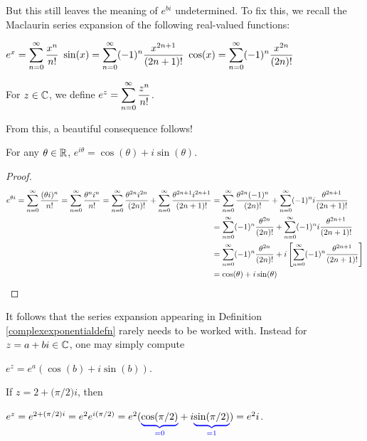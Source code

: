 \documentclass[11pt,fleqn,dvipsnames,usenames]{article}
\newcommand{\p}{\noindent}
\begin{document}
\p But this still leaves the meaning of $e^{bi}$ undetermined.  To fix this, we recall the Maclaurin series expansion of the following real-valued functions:
\begin{center}
$e^{x} = \displaystyle\sum\limits_{n=0}^{\infty}\frac{x^{n}}{n!}$\hspace{2cm}
$\sin(x) = \displaystyle\sum\limits_{n=0}^{\infty}(-1)^{n}\frac{x^{2n+1}}{(2n+1)!}$\hspace{2cm}
$\cos(x) = \displaystyle\sum\limits_{n=0}^{\infty}(-1)^{n}\frac{x^{2n}}{(2n)!}$
\end{center}
\vsp

\begin{definition}\label{complexexponentialdefn}
For $z\in\mathbb{C}$, we define $e^{z} = \displaystyle\sum\limits_{n=0}^{\infty}\frac{z^{n}}{n!}$.
\end{definition}
\vsp

\p From this, a beautiful consequence follows!
\vsp

\begin{theorem}\label{eulersformula}
For any $\theta\in\mathbb{R}$, $e^{i\theta} = \cos(\theta) + i\sin(\theta)$.
\end{theorem}

\begin{proof}
\begin{align*}
e^{\theta i} = \displaystyle\sum\limits_{n=0}^{\infty}\frac{(\theta i)^{n}}{n!} = \displaystyle\sum\limits_{n=0}^{\infty}\frac{\theta^{n}i^{n}}{n!} = \displaystyle\sum\limits_{n=0}^{\infty}\frac{\theta^{2n}i^{2n}}{(2n)!} + \displaystyle\sum\limits_{n=0}^{\infty}\frac{\theta^{2n+1}i^{2n+1}}{(2n+1)!} &= \displaystyle\sum\limits_{n=0}^{\infty}\frac{\theta^{2n}(-1)^n}{(2n)!} + \displaystyle\sum\limits_{n=0}^{\infty}(-1)^{n}i\frac{\theta^{2n+1}}{(2n+1)!}\\
&= \displaystyle\sum\limits_{n=0}^{\infty}(-1)^{n}\frac{\theta^{2n}}{(2n)!} + \displaystyle\sum\limits_{n=0}^{\infty}(-1)^{n}i\frac{\theta^{2n+1}}{(2n+1)!}\\
&= \displaystyle\sum\limits_{n=0}^{\infty}(-1)^{n}\frac{\theta^{2n}}{(2n)!} + i\left[\displaystyle\sum\limits_{n=0}^{\infty}(-1)^{n}\frac{\theta^{2n+1}}{(2n+1)!}\right]\\
&= \cos(\theta) + i\sin(\theta) \tag*{\qedhere}
\end{align*}
\end{proof}
\vsp

\p It follows that the series expansion appearing in Definition \ref{complexexponentialdefn} rarely needs to be worked with.  Instead for $z = a + bi\in \mathbb{C}$, one may simply compute
\begin{center}
$e^{z} = e^{a}(\cos(b) + i\sin(b))$.
\end{center}
%
\begin{example}
If $z = 2 + \big(\pi/2\big)i$, then
\begin{center}
$e^{z} = e^{2 + (\pi/2) i} = e^{2}e^{i(\pi/2)} = e^{2}({\color{blue}\underbrace{{\color{black}\cos(\pi/2)}}_{=0}} + i{\color{blue}\underbrace{{\color{black}\sin(\pi/2)}}_{=1}}) = e^{2}i$.
\end{center}
\end{example}
\end{document}
